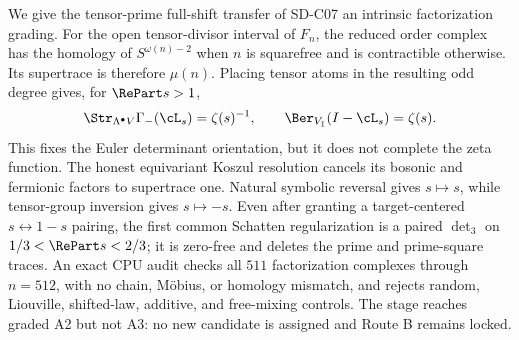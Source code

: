 We give the tensor-prime full-shift transfer of SD-C07 an intrinsic
factorization grading. For the open tensor-divisor interval of $F_n$, the
reduced order complex has the homology of $S^{\omega(n)-2}$ when $n$ is
squarefree and is contractible otherwise. Its supertrace is therefore
$\mu(n)$. Placing tensor atoms in the resulting odd degree gives, for
$\RePart s>1$,
\[
 \Str_{\Lambda^\bullet V}\Gamma_-(\cL_s)=\zeta(s)^{-1},
 \qquad
 \Ber_{V_{\bar1}}(I-\cL_s)=\zeta(s).
\]
This fixes the Euler determinant orientation, but it does not complete the
zeta function. The honest equivariant Koszul resolution cancels its bosonic
and fermionic factors to supertrace one. Natural symbolic reversal gives
$s\mapsto s$, while tensor-group inversion gives $s\mapsto-s$. Even after
granting a target-centered $s\leftrightarrow1-s$ pairing, the first common
Schatten regularization is a paired $\det_3$ on
$1/3<\RePart s<2/3$; it is zero-free and deletes the prime and prime-square
traces. An exact CPU audit checks all $511$ factorization complexes through
$n=512$, with no chain, M\"obius, or homology mismatch, and rejects random,
Liouville, shifted-law, additive, and free-mixing controls. The stage reaches
graded A2 but not A3: no new candidate is assigned and Route B remains
locked.
